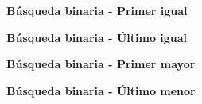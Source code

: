\textbf{Búsqueda binaria - Primer igual}


\textbf{Búsqueda binaria - Último igual}


\textbf{Búsqueda binaria - Primer mayor}


\textbf{Búsqueda binaria - Último menor}


